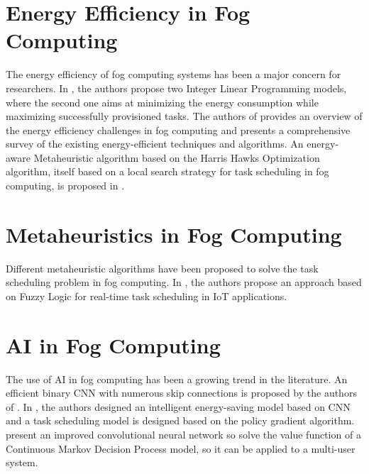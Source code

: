 \section*{Energy Efficiency in Fog Computing}

The energy efficiency of fog computing systems has been a major concern for researchers. In \cite{he-et-al-2020}, the
authors propose two Integer Linear Programming models, where the second one aims at minimizing the energy consumption
while maximizing successfully provisioned tasks. The authors of \cite{malik-et-al-2022} provides an overview of the
energy efficiency challenges in fog computing and presents a comprehensive survey of the existing energy-efficient
techniques and algorithms. An energy-aware Metaheuristic algorithm based on the Harris Hawks Optimization algorithm,
itself based on a local search strategy for task scheduling in fog computing, is proposed in
\cite{abdel-basset-et-al-2021}.

\section*{Metaheuristics in Fog Computing}

Different metaheuristic algorithms have been proposed to solve the task scheduling problem in fog computing. In
\cite{ali-et-al-2021}, the authors propose an approach based on Fuzzy Logic for real-time task scheduling in IoT
applications.

\section*{AI in Fog Computing}

The use of AI in fog computing has been a growing trend in the literature. An efficient binary CNN with numerous skip
connections is proposed by the authors of \cite{wu-et-al-2021}. In \cite{yang-et-al-2022}, the authors designed an
intelligent energy-saving model based on CNN and a task scheduling model is designed based on the policy gradient
algorithm. \cite{jing-xue-2023} present an improved convolutional neural network so solve the value function of a
Continuous Markov Decision Process model, so it can be applied to a multi-user system.
